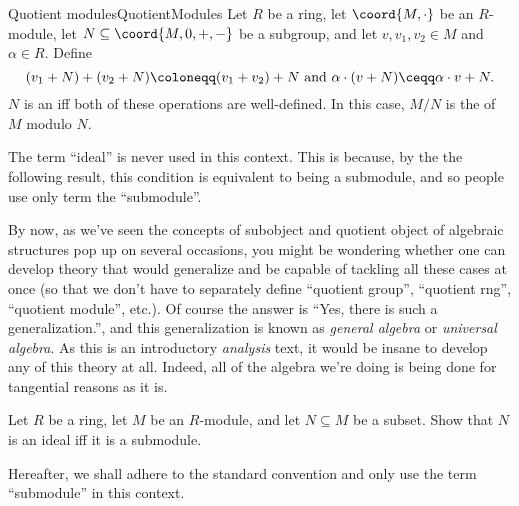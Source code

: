 \begin{dfn}{Quotient modules}{QuotientModules}
Let $R$ be a ring, let $\coord{M,\cdot}$ be an $R$-module, let $N\subseteq \coord{M,0,+,-}$ be a subgroup, and let $v,v_1,v_2\in M$ and $\alpha \in R$.  Define
\begin{equation*}
(v_1+N)+(v_2+N)\coloneqq (v_1+v_2)+N\text{ and }\alpha \cdot (v+N)\ceqq \alpha \cdot v+N.
\end{equation*}
$N$ is an  iff both of these operations are well-defined.  In this case, $M/N$ is the  of $M$ modulo $N$.
\begin{rmk}
The term ``ideal'' is never used in this context.  This is because, by the the following result, this condition is equivalent to being a submodule, and so people use only term the ``submodule''.
\end{rmk}
\begin{rmk}
By now, as we've seen the concepts of subobject and quotient object of algebraic structures pop up on several occasions, you might be wondering whether one can develop theory that would generalize and be capable of tackling all these cases at once (so that we don't have to separately define ``quotient group'', ``quotient rng'', ``quotient module'', etc.).  Of course the answer is ``Yes, there is such a generalization.'', and this generalization is known as \emph{general algebra} or \emph{universal algebra}.  As this is an introductory \emph{analysis} text, it would be insane to develop any of this theory at all.  Indeed, all of the algebra we're doing is being done for tangential reasons as it is.
\end{rmk}
\end{dfn}
\begin{exr}{}{}
Let $R$ be a ring, let $M$ be an $R$-module, and let $N\subseteq M$ be a subset.  Show that $N$ is an ideal iff it is a submodule.
\begin{rmk}
Hereafter, we shall adhere to the standard convention and only use the term ``submodule'' in this context.
\end{rmk}
\end{exr}

